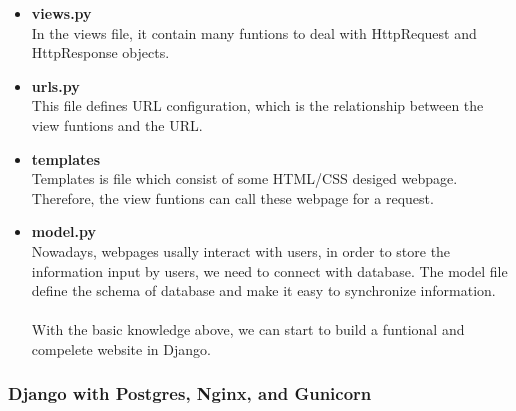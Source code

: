 \begin{itemize}
		\item \textbf{views.py}\\
			  In the views file, it contain many funtions to deal with HttpRequest and  HttpResponse objects.
		\item \textbf{urls.py}\\
			  This file defines URL configuration, which is the relationship between the view funtions and the URL.
		\item \textbf{templates}\\
			  Templates is file which consist of some HTML/CSS desiged webpage. Therefore, the view funtions can call these webpage for a request.
		\item \textbf{model.py}\\
			  Nowadays, webpages usally interact with users, in order to store the information input by users, we need to connect with database. The model file define the schema of database and make it easy to synchronize information.\\\\
With the basic knowledge above, we can start to build a funtional and compelete website in Django.
\end{itemize}
\subsubsection{Django with Postgres, Nginx, and Gunicorn}
